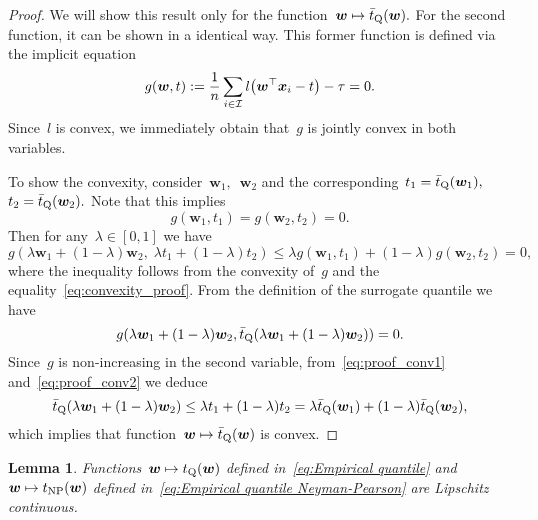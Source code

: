 \documentclass[11pt,a4paper]{article}
\newtheorem{lemma}[thm]{Lemma}
\theoremstyle{definition}
\let\originalleft\left
\let\originalright\right
\renewcommand{\left}{\mathopen{}\mathclose\bgroup\originalleft}
\renewcommand{\right}{\aftergroup\egroup\originalright}
\newcommand{\I}{\mathcal{I}}
\begin{document}
\begin{proof}
  We will show this result only for the function~$\bm{w} \mapsto \bar t_{\rm Q}(\bm{w}).$ For the second function, it can be shown in a identical way. This former function is defined via the implicit equation
  \begin{equation*}
    g(\bm{w}, t) := \frac{1}{n} \sum_{i \in\I} l\left(\bm{w}^\top \bm{x}_i - t \right) - \tau = 0.
  \end{equation*}
  Since~$l$ is convex, we immediately obtain that~$g$ is jointly convex in both variables.

  To show the convexity, consider~$\bm{w}_1,$~$\bm{w}_2$ and the corresponding~$t_1 = \bar t_{\rm Q}(\bm{w}_1),$~$t_2 = \bar t_{\rm Q}(\bm{w}_2).$ Note that this implies
  \begin{equation}\label{eq:convexity_proof}
    g(\bm{w}_1, t_1) = g(\bm{w}_2,t_2)=0. 
  \end{equation}
  Then for any~$\lambda \in [0,1]$ we have
  \begin{equation}\label{eq:proof_conv1}
    g(\lambda \bm{w}_{1} + (1 - \lambda)\bm{w}_{2}, \;\lambda t_{1} + (1 - \lambda)t_{2}) \leq \lambda g(\bm{w}_{1}, t_{1}) + (1 - \lambda)g(\bm{w}_{2},t_{2}) = 0,
  \end{equation}
  where the inequality follows from the convexity of~$g$ and the equality~\eqref{eq:convexity_proof}. From the definition of the surrogate quantile we have
  \begin{equation}\label{eq:proof_conv2}
    g(\lambda\bm{w}_{1}+(1-\lambda)\bm{w}_{2},\bar{t}_{\rm Q}(\lambda\bm{w}_{1}+(1-\lambda)\bm{w}_{2}))=0.
  \end{equation}
  Since~$g$ is non-increasing in the second variable, from~\eqref{eq:proof_conv1} and~\eqref{eq:proof_conv2} we deduce
  \begin{equation*}
  \bar{t}_{\rm Q}(\lambda\bm{w}_{1}+(1-\lambda)\bm{w}_{2})\le\lambda t_{1}+(1-\lambda)t_{2} =\lambda\bar{t}_{\rm Q}(\bm{w}_{1})+(1-\lambda)\bar{t}_{\rm Q}(\bm{w}_{2}),
  \end{equation*}
  which implies that function~$\bm{w} \mapsto \bar t_{\rm Q}(\bm{w})$ is convex.
\end{proof}

\begin{lemma}\label{lemma:quantile_continuous}
  Functions~$\bm{w}\mapsto t_{\rm Q}(\bm{w})$ defined in~\eqref{eq:Empirical quantile} and~$\bm{w}\mapsto t_{\rm NP}(\bm{w})$ defined in~\eqref{eq:Empirical quantile Neyman-Pearson} are Lipschitz continuous.
\end{lemma}
\end{document}
